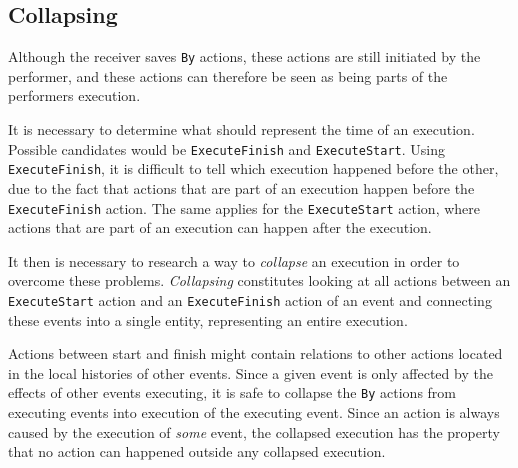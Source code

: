 	

	\subsection{Collapsing}
	Although the receiver saves \texttt{By} actions, these actions are still initiated by the performer, and these actions can therefore be seen as being parts of the performers execution. 
		
	It is necessary to determine what should represent the time of an execution. Possible candidates would be \texttt{ExecuteFinish} and \texttt{ExecuteStart}. Using \texttt{ExecuteFinish}, it is difficult to tell which execution happened before the other, due to the fact that actions that are part of an execution happen before the \texttt{ExecuteFinish} action. 
	The same applies for the \texttt{ExecuteStart} action, where actions that are part of an execution can happen after the execution.
	
	\newpar It then is necessary to research a way to \textit{collapse} an execution in order to overcome these problems. \textit{Collapsing} constitutes looking at all actions between an \texttt{ExecuteStart} action and an \texttt{ExecuteFinish} action of an event and connecting these events into a single entity, representing an entire execution. 
	
	Actions between start and finish might contain relations to other actions located in the local histories of other events. Since a given event is only affected by the effects of other events executing, it is safe to collapse the \texttt{By} actions from executing events into execution of the executing event. Since an action is always caused by the execution of \textit{some} event, the collapsed execution has the property that no action can happened outside any collapsed execution.
	
